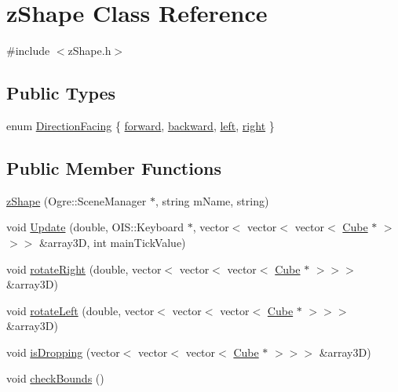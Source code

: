 \hypertarget{classz_shape}{\section{z\-Shape Class Reference}
\label{classz_shape}
}


{\ttfamily \#include $<$z\-Shape.\-h$>$}

\subsection*{Public Types}
\begin{DoxyCompactItemize}
\item 
enum \hyperlink{classz_shape_ab60d2ccafff31987c3134b99ffdfc168}{Direction\-Facing} \{ \hyperlink{classz_shape_ab60d2ccafff31987c3134b99ffdfc168a98b5b9f6eef05dacfae77a1c2c5f673e}{forward}, 
\hyperlink{classz_shape_ab60d2ccafff31987c3134b99ffdfc168a015e7b2c5830dee71428db58cbe54e91}{backward}, 
\hyperlink{classz_shape_ab60d2ccafff31987c3134b99ffdfc168ac37933597ccfb2403963ab3478b1ba02}{left}, 
\hyperlink{classz_shape_ab60d2ccafff31987c3134b99ffdfc168a577911cbdcc7c610f87e71814cfdad6c}{right}
 \}
\end{DoxyCompactItemize}
\subsection*{Public Member Functions}
\begin{DoxyCompactItemize}
\item 
\hyperlink{classz_shape_a43735d5c74aa0ab56ba2dcdc392d5212}{z\-Shape} (Ogre\-::\-Scene\-Manager $\ast$, string m\-Name, string)
\item 
void \hyperlink{classz_shape_a2d6800f8defaa73954657e103257a520}{Update} (double, O\-I\-S\-::\-Keyboard $\ast$, vector$<$ vector$<$ vector$<$ \hyperlink{class_cube}{Cube} $\ast$ $>$$>$$>$ \&array3\-D, int main\-Tick\-Value)
\item 
void \hyperlink{classz_shape_aebd07968a31f6bf2e3378227d3a4f1a7}{rotate\-Right} (double, vector$<$ vector$<$ vector$<$ \hyperlink{class_cube}{Cube} $\ast$ $>$$>$$>$ \&array3\-D)
\item 
void \hyperlink{classz_shape_a6475eb27003e84467d73dea3603520ed}{rotate\-Left} (double, vector$<$ vector$<$ vector$<$ \hyperlink{class_cube}{Cube} $\ast$ $>$$>$$>$ \&array3\-D)
\item 
void \hyperlink{classz_shape_a95fbe17176889608178c1831ade80c16}{is\-Dropping} (vector$<$ vector$<$ vector$<$ \hyperlink{class_cube}{Cube} $\ast$ $>$$>$$>$ \&array3\-D)
\item 
void \hyperlink{classz_shape_ac599f1a0c6920db0ee7fee7bbe2268e9}{check\-Bounds} ()
\end{DoxyCompactItemize}
